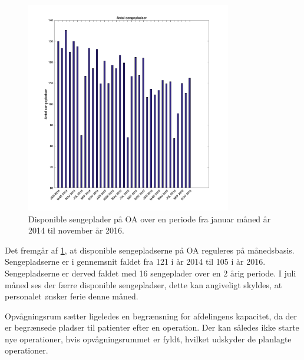 \begin{figure}[H] 
\begin{center}
\includegraphics[width=0.8\textwidth]{figures/sengepladser}
\end{center}
\caption{Disponible sengeplader på OA over en periode fra januar måned år 2014 til november år 2016.} 
\label{fig:sengepladser} 
\end{figure}

Det fremgår af \ref{fig:sengepladser}, at disponible sengepladserne på OA reguleres på månedsbasis. Sengepladserne er i gennemsnit faldet fra 121 i år 2014 til 105 i år 2016. Sengepladserne er derved faldet med 16 sengeplader over en 2 årig periode. I juli måned ses der færre disponible sengepladser, dette kan angiveligt skyldes, at personalet ønsker ferie denne måned. 

Opvågningsrum sætter ligeledes en begrænsning for afdelingens kapacitet, da der er begrænsede pladser til patienter efter en operation. Der kan således ikke starte nye operationer, hvis opvågningsrummet er fyldt, hvilket udskyder de planlagte operationer. 